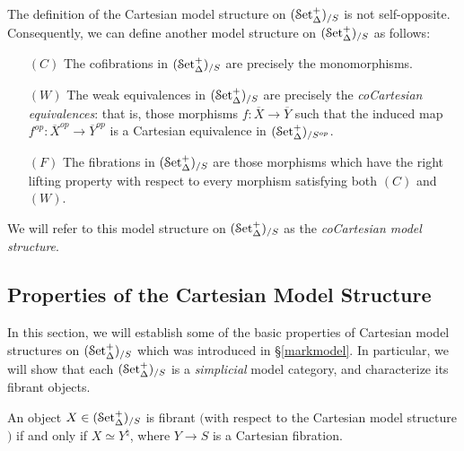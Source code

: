 \begin{remark}\label{twuff}
The definition of the Cartesian model structure on $(\operatorname{\mathcal{S}et_{\Delta}^{+}})_{/S}$ is not self-opposite. Consequently, we can define another model structure on $(\operatorname{\mathcal{S}et_{\Delta}^{+}})_{/S}$ as follows:
\begin{itemize}
\item[$(C)$] The cofibrations in $(\operatorname{\mathcal{S}et_{\Delta}^{+}})_{/S}$ are precisely the monomorphisms.
\item[$(W)$] The weak equivalences in $(\operatorname{\mathcal{S}et_{\Delta}^{+}})_{/S}$ are precisely the
{\it coCartesian equivalences}:
that is, those morphisms $f: \overline{X} \rightarrow \overline{Y}$ such that the induced map
$f^{op}: \overline{X}^{op} \rightarrow \overline{Y}^{op}$ is a Cartesian equivalence in
$(\operatorname{\mathcal{S}et_{\Delta}^{+}})_{/S^{op}}$. 
\item[$(F)$] The fibrations in $(\operatorname{\mathcal{S}et_{\Delta}^{+}})_{/S}$ are those morphisms which have the right lifting property with respect to every morphism satisfying both $(C)$ and $(W)$.
\end{itemize}
We will refer to this model structure on $(\operatorname{\mathcal{S}et_{\Delta}^{+}})_{/S}$ as the {\it coCartesian model structure}.
\end{remark}

\subsection{Properties of the Cartesian Model Structure}\label{markprop}

In this section, we will establish some of the basic properties of Cartesian model structures
on $(\operatorname{\mathcal{S}et_{\Delta}^{+}})_{/S}$ which was introduced in \S \ref{markmodel}. In particular, we will show that each $(\operatorname{\mathcal{S}et_{\Delta}^{+}})_{/S}$ is a {\it simplicial} model category, and characterize its fibrant objects.

\begin{proposition}\label{markedfibrant}
An object $X \in (\operatorname{\mathcal{S}et_{\Delta}^{+}})_{/S}$ is fibrant $($with respect to the Cartesian model structure$)$ if and only if $X \simeq Y^{\natural}$, where $Y \rightarrow S$ is a Cartesian fibration.
\end{proposition}

